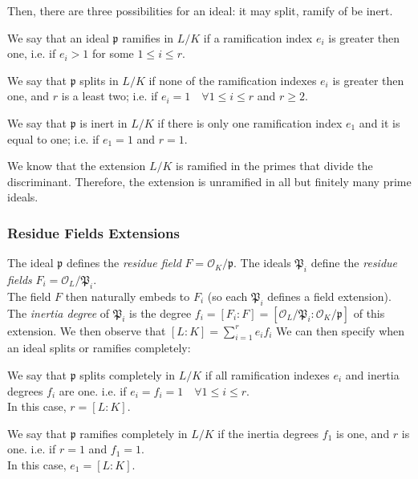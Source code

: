Then, there are three possibilities for an ideal: it may split, ramify of be inert.
\begin{definition}
    We say that an ideal $\mathfrak{p}$ ramifies in $L/K$ if a ramification index $e_i$ is greater then one, 
    i.e. if $e_i>1$ for some $1 \leq i \leq r$.
\end{definition}
\begin{definition}
    We say that $\mathfrak{p}$ splits in $L/K$ if none of the ramification indexes $e_i$ is greater then one, and $r$ is a least two; 
    i.e. if $e_i=1 \quad \forall 1 \leq i \leq r$ and $r \geq 2$.
\end{definition}
\begin{definition}
    We say that $\mathfrak{p}$ is inert in $L/K$ if there is only one ramification index $e_1$ and it is equal to one;
    i.e. if $e_1=1$ and $r=1$.
\end{definition}
We know that the extension $L/K$ is ramified in the primes that divide the discriminant. Therefore, the extension is unramified in all but finitely many prime ideals.


\subsubsection{Residue Fields Extensions}
The ideal $\mathfrak{p}$ defines the \textit{residue field} $F=\mathcal{O}_K/\mathfrak{p}$.
The ideals $\mathfrak{P}_i$ define the \textit{residue fields} $F_i=\mathcal{O}_L/\mathfrak{P}_i$.\\
The field $F$ then naturally embeds to $F_i$ (so each $\mathfrak{P}_i$ defines a field extension).
The \textit{inertia degree} of $\mathfrak{P}_i$ is the degree $f_i=[F_i:F]=[\mathcal{O}_L/\mathfrak{P}_i:\mathcal{O}_K/\mathfrak{p}]$ of this extension.
We then observe that $[L:K] = \sum_{i=1}^r e_if_i$
We can then specify when an ideal splits or ramifies completely:
\begin{definition}
    We say that $\mathfrak{p}$ splits completely in $L/K$ if all ramification indexes $e_i$ and inertia degrees $f_i$ are one.
    i.e. if $e_i=f_i=1 \quad \forall 1 \leq i \leq r$.\\
    In this case, $r=[L:K]$.
\end{definition}
\begin{definition}
    We say that $\mathfrak{p}$ ramifies completely in $L/K$ if the inertia degrees $f_1$ is one, and $r$ is one.
    i.e. if $r=1$ and $f_1=1$.\\
    In this case, $e_1=[L:K]$.
\end{definition}

